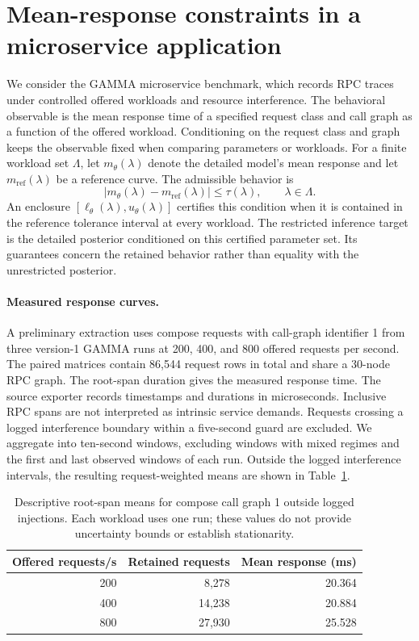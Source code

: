\section{Mean-response constraints in a microservice application}
\label{sec:gamma-experiment}

We consider the GAMMA microservice benchmark, which records RPC traces under
controlled offered workloads and resource interference. The behavioral
observable is the mean response time of a specified request class and call
graph as a function of the offered workload. Conditioning on the request class
and graph keeps the observable fixed when comparing parameters or workloads.
For a finite workload set $\Lambda$, let $m_\theta(\lambda)$ denote the detailed
model's mean response and let $m_{\mathrm{ref}}(\lambda)$ be a reference curve.
The admissible behavior is
\[
 \left|m_\theta(\lambda)-m_{\mathrm{ref}}(\lambda)\right|
 \leq \tau(\lambda), \qquad \lambda\in\Lambda.
\]
An enclosure $[\ell_\theta(\lambda),u_\theta(\lambda)]$ certifies this condition
when it is contained in the reference tolerance interval at every workload.
The restricted inference target is the detailed posterior conditioned on this
certified parameter set. Its guarantees concern the retained behavior rather
than equality with the unrestricted posterior.

\paragraph{Measured response curves.}
A preliminary extraction uses compose requests with call-graph identifier 1
from three version-1 GAMMA runs at 200, 400, and 800 offered requests per second.
The paired matrices contain 86,544 request rows in total and share a 30-node RPC
graph. The root-span duration gives the measured response time. The source
exporter records timestamps and durations in microseconds. Inclusive RPC
spans are not interpreted as intrinsic service demands.
Requests crossing a logged interference boundary within a five-second guard
are excluded. We aggregate into ten-second windows, excluding windows with
mixed regimes and the first and last observed windows of each run.
Outside the logged interference intervals, the resulting request-weighted
means are shown in Table~\ref{tab:gamma-pilot}.

\begin{table}[t]
\centering
\begin{tabular}{rrr}
\toprule
Offered requests/s & Retained requests & Mean response (ms) \\
\midrule
200 & 8,278 & 20.364 \\
400 & 14,238 & 20.884 \\
800 & 27,930 & 25.528 \\
\bottomrule
\end{tabular}
\caption{Descriptive root-span means for compose call graph 1 outside logged
injections. Each workload uses one run; these values do not provide uncertainty
bounds or establish stationarity.}
\label{tab:gamma-pilot}
\end{table}

